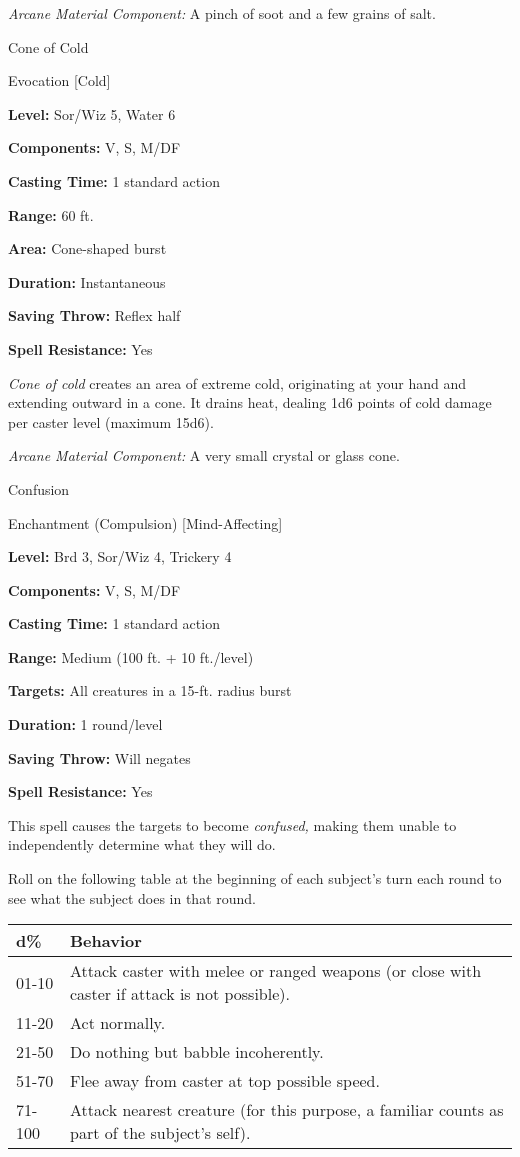 \documentclass{article}
\begin{document}
\textit{Arcane Material Component: }A pinch of soot and a few grains of salt.

\vspace{12pt}
Cone of Cold

Evocation [Cold]

\textbf{Level:} Sor/Wiz 5, Water 6

\textbf{Components:} V, S, M/DF

\textbf{Casting Time:} 1 standard action

\textbf{Range:} 60 ft.

\textbf{Area:} Cone-shaped burst

\textbf{Duration:} Instantaneous

\textbf{Saving Throw:} Reflex half

\textbf{Spell Resistance:} Yes

\textit{Cone of cold }creates an area of extreme cold, originating at your hand 
and extending outward in a cone. It drains heat, dealing 1d6 points of cold damage 
per caster level (maximum 15d6).

\textit{Arcane Material Component: }A very small crystal or glass cone.

\vspace{12pt}
Confusion

Enchantment (Compulsion) [Mind-Affecting]

\textbf{Level:} Brd 3, Sor/Wiz 4, Trickery 4

\textbf{Components:} V, S, M/DF

\textbf{Casting Time:} 1 standard action

\textbf{Range: }Medium (100 ft. + 10 ft./level)

\textbf{Targets:} All creatures in a 15-ft. radius burst

\textbf{Duration:} 1 round/level

\textbf{Saving Throw: }Will negates

\textbf{Spell Resistance:} Yes

This spell causes the targets to become \textit{confused, }making them unable to 
independently determine what they will do.

Roll on the following table at the beginning of each subject's turn each round 
to see what the subject does in that round.

\begin{tabular}{|>{\raggedright}p{25pt}|>{\raggedright}p{301pt}|}
\hline
d\textbf{\%} & B\textbf{ehavior}\tabularnewline
\hline
01-10 & Attack caster with melee or ranged weapons (or close with caster if attack 
is not possible).\tabularnewline
\hline
11-20 & Act normally.\tabularnewline
\hline
21-50 & Do nothing but babble incoherently.\tabularnewline
\hline
51-70 & Flee away from caster at top possible speed.\tabularnewline
\hline
71-100 & Attack nearest creature (for this purpose, a familiar counts as part of 
the subject's self).\tabularnewline
\hline
\end{tabular}
\end{document}
